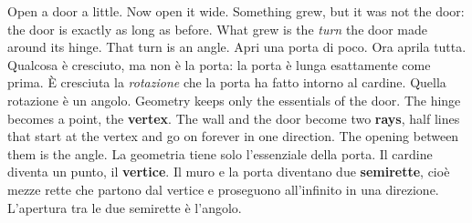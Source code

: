 \label{ch:angles}

\label{sec:turn}
\begin{bi}
\colheads
Open a door a little. Now open it wide. Something grew, but it was not the door: the door is exactly as long as before. What grew is the \emph{turn} the door made around its hinge. That turn is an angle.
\IT
Apri una porta di poco. Ora aprila tutta. Qualcosa è cresciuto, ma non è la porta: la porta è lunga esattamente come prima. È cresciuta la \emph{rotazione} che la porta ha fatto intorno al cardine. Quella rotazione è un angolo.
\EN
Geometry keeps only the essentials of the door. The hinge becomes a point, the \textbf{vertex}. The wall and the door become two \textbf{rays}, half lines that start at the vertex and go on forever in one direction. The opening between them is the angle.
\IT
La geometria tiene solo l'essenziale della porta. Il cardine diventa un punto, il \textbf{vertice}. Il muro e la porta diventano due \textbf{semirette}, cioè mezze rette che partono dal vertice e proseguono all'infinito in una direzione. L'apertura tra le due semirette è l'angolo.
\end{bi}


